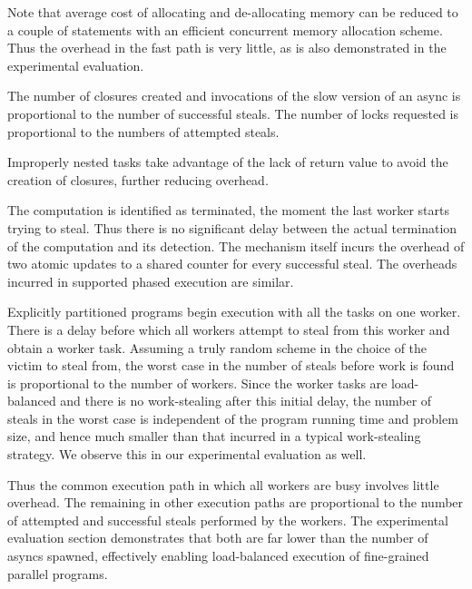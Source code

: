 Note that average cost of allocating and de-allocating memory can be
reduced to a couple of statements with an efficient concurrent memory
allocation scheme. Thus the overhead in the fast path is very
little, as is also demonstrated in the experimental evaluation.

The number of closures created and invocations of the slow version of
an async is proportional to the number of successful steals. The
number of locks requested is proportional to the numbers of attempted
steals. 

Improperly nested tasks take advantage of the lack of return value to
avoid the creation of closures, further reducing overhead. 

The computation is identified as terminated, the moment the last
worker starts trying to steal. Thus there is no significant delay
between the actual termination of the computation and its detection.
The mechanism itself incurs the overhead of two atomic updates to a
shared counter for every successful steal. The overheads incurred in
supported phased execution are similar.

Explicitly partitioned programs begin execution with all the tasks on
one worker. There is a delay before which all workers attempt to steal
from this worker and obtain a worker task. Assuming a truly random
scheme in the choice of the victim to steal from, the worst case in
the number of steals before work is found is proportional to the
number of workers. Since the worker tasks are load-balanced and there
is no work-stealing after this initial delay, the number of steals in
the worst case is independent of the program running time and problem
size, and hence much smaller than that incurred in a typical
work-stealing strategy. We observe this in our experimental evaluation
as well. 


Thus the common execution path in which all workers are busy involves
little overhead. The remaining in other execution paths are
proportional to the number of attempted and successful steals
performed by the workers. The experimental evaluation section
demonstrates that both are far lower than the number of asyncs
spawned, effectively enabling load-balanced execution of fine-grained
parallel programs.

